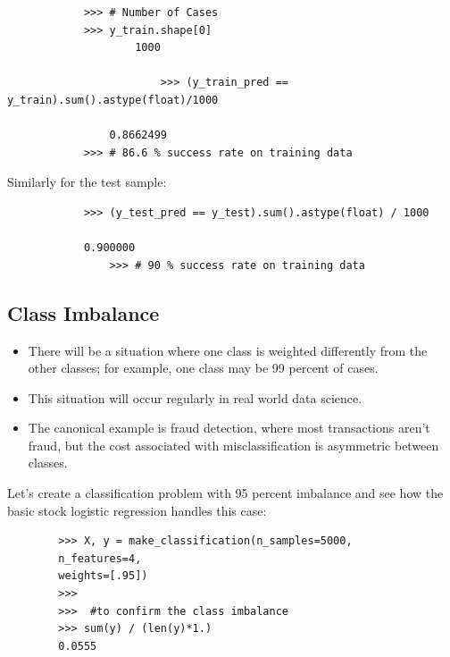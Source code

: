 \documentclass[SKL-MASTER.tex]{subfiles}
\begin{document}
	{
		\Large
		\begin{framed}
			\begin{verbatim}
			>>> # Number of Cases
			>>> y_train.shape[0]
					1000
				
						>>> (y_train_pred == y_train).sum().astype(float)/1000
			
				0.8662499
			>>> # 86.6 % success rate on training data
			\end{verbatim}
		\end{framed}
	}
	\noindent Similarly for the test sample:
	{
		\Large
		\begin{framed}
			\begin{verbatim}
			>>> (y_test_pred == y_test).sum().astype(float) / 1000
			
			0.900000
				>>> # 90 % success rate on training data
			\end{verbatim}
		\end{framed}
	}
\newpage
	\subsection*{Class Imbalance}
	\begin{itemize}
		
		\item There will be a situation where one class is weighted differently
		from the other classes; for example, one class may be 99 percent of cases. 
		\item This situation will occur regularly in real world data science. 
		\item The canonical example is fraud detection,
		where most transactions aren't fraud, but the cost associated with misclassification is
		asymmetric between classes.
	\end{itemize}
	\newpage
	
	\noindent Let's create a classification problem with 95 percent imbalance and see how the basic stock
	logistic regression handles this case:
	
	
	\begin{framed}
		\begin{verbatim}
		>>> X, y = make_classification(n_samples=5000, 
		n_features=4,
		weights=[.95])
		>>>
		>>>  #to confirm the class imbalance
		>>> sum(y) / (len(y)*1.)
		0.0555
		\end{verbatim}
	\end{framed}
	
\end{document}
